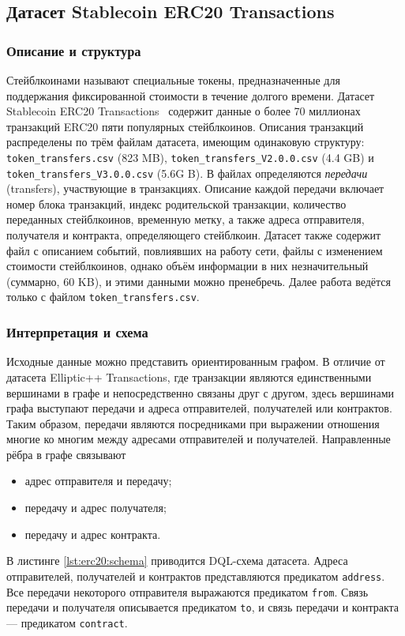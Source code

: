 \subsection{Датасет Stablecoin ERC20 Transactions} \label{datasetERC20}

\subsubsection{Описание и структура}

Стейблкоинами называют специальные токены, предназначенные для поддержания фиксированной стоимости в течение долгого
времени. Датасет Stablecoin ERC20 Transactions~\cite{erc20} содержит данные о более 70 миллионах транзакций ERC20
пяти популярных стейблкоинов. Описания транзакций распределены по трём файлам датасета, имеющим одинаковую структуру:
\texttt{token\_transfers.csv} (823 MB), \texttt{token\_transfers\_V2.0.0.csv} (4.4 GB)
и \texttt{token\_transfers\_V3.0.0.csv} (5.6G B). В файлах определяются \textit{передачи} (transfers), участвующие в
транзакциях. Описание каждой передачи включает номер блока транзакций, индекс родительской транзакции, количество
переданных стейблкоинов, временную метку, а также адреса отправителя, получателя и контракта, определяющего стейблкоин.
Датасет также содержит файл с описанием событий, повлиявших на работу сети, файлы с изменением стоимости стейблкоинов,
однако объём информации в них незначительный (суммарно, 60 KB), и этими данными можно пренебречь. Далее работа ведётся
только с файлом \texttt{token\_transfers.csv}.

\subsubsection{Интерпретация и схема}

Исходные данные можно представить ориентированным графом. В отличие от датасета Elliptic++ Transactions, где транзакции
являются единственными вершинами в графе и непосредственно связаны друг с другом, здесь вершинами графа выступают
передачи и адреса отправителей, получателей или контрактов. Таким образом, передачи являются посредниками при
выражении отношения многие ко многим между адресами отправителей и получателей. Направленные рёбра в графе связывают
\begin{itemize}
    \item адрес отправителя и передачу;
    \item передачу и адрес получателя;
    \item передачу и адрес контракта.
\end{itemize}
В листинге \ref{lst:erc20:schema} приводится DQL-схема датасета. Адреса отправителей, получателей и контрактов
представляются предикатом \texttt{address}. Все передачи некоторого отправителя выражаются предикатом \texttt{from}. Связь
передачи и получателя описывается предикатом \texttt{to}, и связь передачи и контракта --- предикатом \texttt{contract}.

